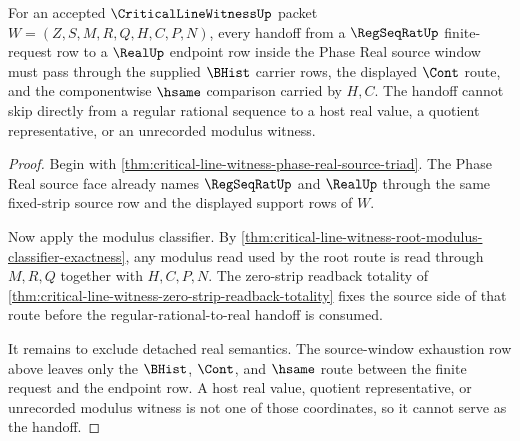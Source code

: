 \begin{theorem}
\label{thm:critical-line-witness-regseqrat-real-modulus-handoff}
For an accepted $\CriticalLineWitnessUp$ packet $W=(Z,S,M,R,Q,H,C,P,N)$, every handoff from a $\RegSeqRatUp$ finite-request row to a $\RealUp$ endpoint row inside the Phase Real source window must pass through the supplied $\BHist$ carrier rows, the displayed $\Cont$ route, and the componentwise $\hsame$ comparison carried by $H,C$. The handoff cannot skip directly from a regular rational sequence to a host real value, a quotient representative, or an unrecorded modulus witness.
\end{theorem}
\begin{proof}
Begin with \autoref{thm:critical-line-witness-phase-real-source-triad}. The Phase Real source face already names $\RegSeqRatUp$ and $\RealUp$ through the same fixed-strip source row and the displayed support rows of $W$.

Now apply the modulus classifier. By \autoref{thm:critical-line-witness-root-modulus-classifier-exactness}, any modulus read used by the root route is read through $M,R,Q$ together with $H,C,P,N$. The zero-strip readback totality of \autoref{thm:critical-line-witness-zero-strip-readback-totality} fixes the source side of that route before the regular-rational-to-real handoff is consumed.

It remains to exclude detached real semantics. The source-window exhaustion row above leaves only the $\BHist$, $\Cont$, and $\hsame$ route between the finite request and the endpoint row. A host real value, quotient representative, or unrecorded modulus witness is not one of those coordinates, so it cannot serve as the handoff.
\end{proof}

